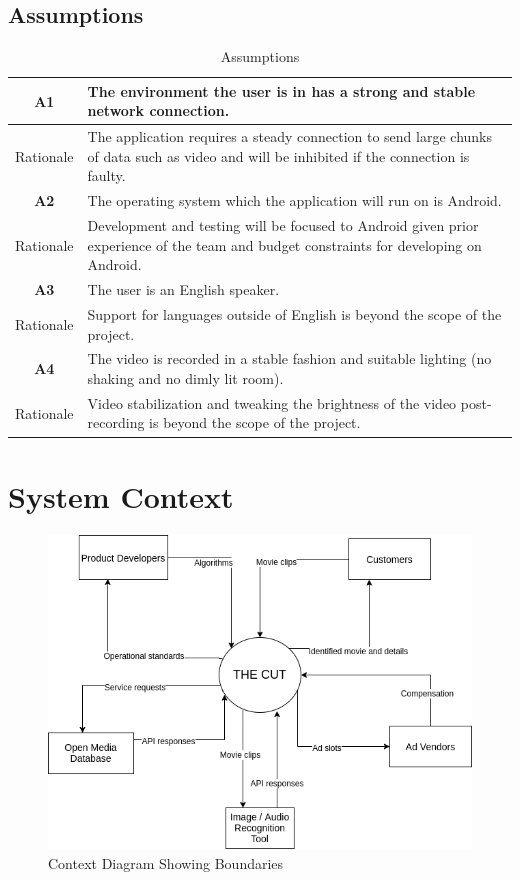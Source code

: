 \documentclass{article}
\begin{document}
\subsection{Assumptions}

\begin{table}[H]
    \caption{Assumptions}
    \centering
    \begin{tabularx}{\textwidth}{|c|X|} \hline
        \textbf{A1} & The environment the user is in has a strong and stable network connection. \\ \hline
        Rationale & The application requires a steady connection to send large chunks of data such as video and will be inhibited if the connection is faulty.  \\ \hline \hline
        \textbf{A2} & The operating system which the application will run on is Android. \\ \hline
        Rationale & Development and testing will be focused to Android given prior experience of the team and budget constraints for developing on Android.  \\ \hline \hline
        \textbf{A3} & The user is an English speaker. \\ \hline
        Rationale & Support for languages outside of English is beyond the scope of the project. \\ \hline \hline
        \textbf{A4} & The video is recorded in a stable fashion and suitable lighting (no shaking and no dimly lit room). \\ \hline
        Rationale & Video stabilization and tweaking the brightness of the video post-recording is beyond the scope of the project. \\ \hline
    \end{tabularx}
    \label{tab:Assumptions}
\end{table}

\section{System Context}

\begin{figure}[H]
    \centering
    \includegraphics[width = \textwidth]{ContextDiagram.png}
    \caption{Context Diagram Showing Boundaries}
    \label{fig:Context}
\end{figure}
\end{document}
